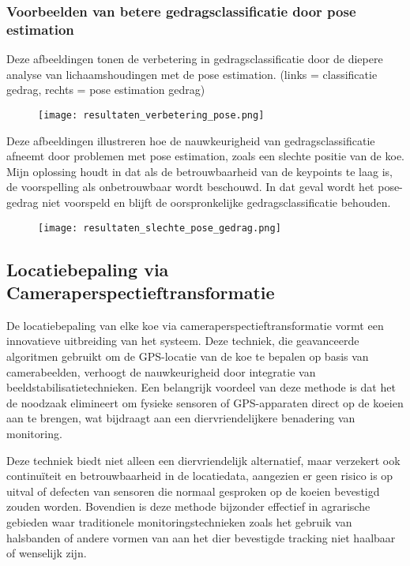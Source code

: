 \subsubsection{Voorbeelden van betere gedragsclassificatie door pose estimation}
Deze afbeeldingen tonen de verbetering in gedragsclassificatie door de diepere analyse van lichaamshoudingen met de pose estimation. (links = classificatie gedrag, rechts = pose estimation gedrag)
\newline
\begin{figure}[H]
  \centering
  \texttt{[image: resultaten\_verbetering\_pose.png]}
  \label{fig:resultaten_verbetering_pose}
\end{figure}
\newline
Deze afbeeldingen illustreren hoe de nauwkeurigheid van gedragsclassificatie afneemt door problemen met pose estimation, zoals een slechte positie van de koe. Mijn oplossing houdt in dat als de betrouwbaarheid van de keypoints te laag is, de voorspelling als onbetrouwbaar wordt beschouwd. In dat geval wordt het pose-gedrag niet voorspeld en blijft de oorspronkelijke gedragsclassificatie behouden.
\newline
\begin{figure}[H]
  \centering
  \texttt{[image: resultaten\_slechte\_pose\_gedrag.png]}
  \label{fig:resultaten_slechte_pose_gedrag}  
\end{figure}
\newline
\subsection{Locatiebepaling via Cameraperspectieftransformatie}
De locatiebepaling van elke koe via cameraperspectieftransformatie vormt een innovatieve uitbreiding van het systeem. Deze techniek, die geavanceerde algoritmen gebruikt om de GPS-locatie van de koe te bepalen op basis van camerabeelden, verhoogt de nauwkeurigheid door integratie van beeldstabilisatietechnieken. Een belangrijk voordeel van deze methode is dat het de noodzaak elimineert om fysieke sensoren of GPS-apparaten direct op de koeien aan te brengen, wat bijdraagt aan een diervriendelijkere benadering van monitoring.

Deze techniek biedt niet alleen een diervriendelijk alternatief, maar verzekert ook continuïteit en betrouwbaarheid in de locatiedata, aangezien er geen risico is op uitval of defecten van sensoren die normaal gesproken op de koeien bevestigd zouden worden. Bovendien is deze methode bijzonder effectief in agrarische gebieden waar traditionele monitoringstechnieken zoals het gebruik van halsbanden of andere vormen van aan het dier bevestigde tracking niet haalbaar of wenselijk zijn.

